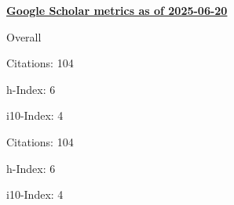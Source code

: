 \textbf{\href{https://scholar.google.it/citations?user=iJDPEaUAAAAJ&hl=it&oi=ao}{Google Scholar metrics as of 2025-06-20}}
\medskip
\centering
\begin{minipage}{.4\textwidth}
    \begin{outerlist}
        \item[] Overall
        \begin{innerlist}
            \item Citations: 104
            \item h-Index: 6
            \item i10-Index: 4
        \end{innerlist}
    \end{outerlist}
\end{minipage}
\hfill
\begin{minipage}{.4\textwidth}
    \begin{outerlist}
        \item[]
        \begin{innerlist}
            \item Citations: 104
            \item h-Index: 6
            \item i10-Index: 4
        \end{innerlist}
    \end{outerlist}
\end{minipage}
\vspace{1em}
